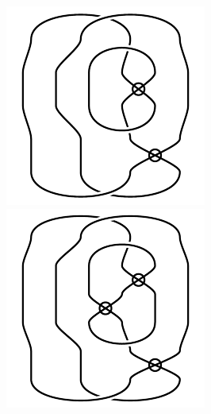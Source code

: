 \begin{figure}[H]
\begin{minipage}[b]{.18\linewidth}
\end{minipage}
\begin{minipage}[b]{.18\linewidth}
\centering
\includegraphics[width=\linewidth]{../data/virtual_4_74.png}
\end{minipage}
\begin{minipage}[b]{.18\linewidth}
\centering
\includegraphics[width=\linewidth]{../data/virtual_4_75.png}

\end{minipage}
\end{figure}
